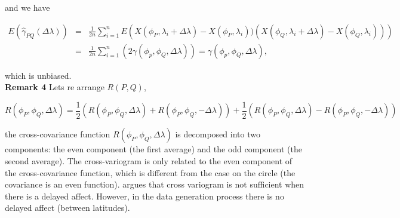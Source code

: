 			and we have
				
				
			\begin{eqnarray*}
				E(\hat{\gamma}_{PQ}(\Delta \lambda)) &=& \frac{1}{2n} \sum_{i=1}^n E\left(X(\phi_P, \lambda_i+\Delta \lambda) - X(\phi_P, \lambda_i))(X(\phi_Q, \lambda_i+\Delta \lambda) - X(\phi_Q, \lambda_i))\right) \\
				&=& \frac{1}{2n} \sum_{i=1}^n \left( 2\gamma(\phi_p, \phi_Q, \Delta\lambda) \right) = \gamma(\phi_p, \phi_Q, \Delta\lambda),
			\end{eqnarray*}
				
			which is unbiased. \\
				
			{\bf Remark 4} Lets re arrange $R(P,Q)$,  
				
			\[
				R(\phi_P, \phi_Q, \Delta \lambda) = \frac{1}{2}(R(\phi_P, \phi_Q, \Delta \lambda) + R(\phi_P, \phi_Q, -\Delta \lambda))+\frac{1}{2}(R(\phi_P, \phi_Q, \Delta \lambda) - R(\phi_P, \phi_Q, -\Delta \lambda)) 
			\]
				
			the cross-covariance function $R(\phi_P, \phi_Q, \Delta \lambda)$ is decomposed into two components: the even component (the first average) and the odd component (the second average). The cross-variogram is only related to the even component of the cross-covariance function, which is different from the case on the circle (the covariance is an even function). \cite{Wackernagel2013} argues that cross variogram is not sufficient when there is a delayed affect. However, in the data generation process there is no delayed affect (between latitudes). 
				
			
			
